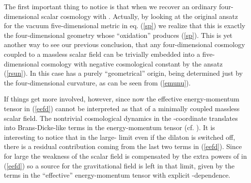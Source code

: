 \documentclass[prd,a4paper,twocolumn,superscriptaddress,nofootinbib,showpacs]{revtex4}
\begin{document}
The first important thing to notice is that when \coordHE{} we recover an ordinary four-dimensional scalar cosmology
with \coordHE{}. Actually,
by looking at the original ansatz for the vacuum five-dimensional metric in eq. (\ref{sp}) we realize that this is exactly the 
four-dimensional geometry whose ``oxidation'' produces (\ref{sp}). This
is yet another way to see our previous conclusion, that any four-dimensional cosmology coupled
to a massless scalar field can be trivially embedded into a five-dimensional cosmology with negative cosmological constant by
the ansatz (\ref{rsun}). In this case \coordHE{} has a purely ``geometrical'' origin, being determined just by the 
four-dimensional curvature, as can be seen from (\ref{emunu}). 

If \coordHE{} things get more involved, however, since now the effective energy-momentum tensor 
in (\ref{eefd}) cannot be interpreted as that of a minimally coupled massless scalar field. The nontrivial cosmological
dynamics in the \myHighlight{$\chi$}\coordHE{}-coordinate translates into Brans-Dicke-like terms in the energy-momentum tensor (cf. \cite{eft}). 
It is interesting to notice that in the large-\coordHE{} limit even if the dilaton \coordHE{} is switched off, there
is a residual contribution coming from the last two terms in (\ref{eefd}). Since \coordHE{} for large \coordHE{}
the weakness of the scalar field is compensated by the extra powers of \coordHE{} in (\ref{eefd}) so a source for the gravitational
field is left in that limit, given by the terms in the ``effective'' energy-momentum tensor with explicit \coordHE{}-dependence.          
\end{document}
